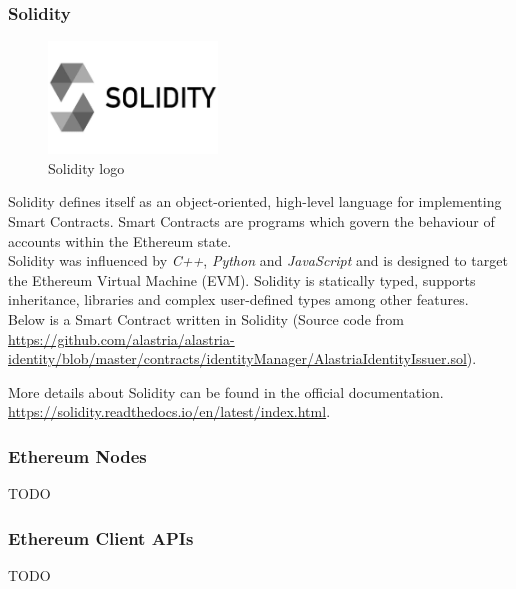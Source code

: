 \documentclass[a4paper, 12pt]{article} %
\begin{document}
        \subsubsection{Solidity}
            \begin{figure}[h]
                \centering
                \includegraphics[width=0.4\textwidth]{solidity-logo.jpg}
                \caption{Solidity logo}
                \label{fig:solidity_logo}
            \end{figure}
            
            Solidity defines itself as an object-oriented, high-level language for implementing Smart Contracts. Smart Contracts are programs which govern the behaviour of accounts within the Ethereum state.\\
            
            Solidity was influenced by \textit{C++}, \textit{Python} and \textit{JavaScript} and is designed to target the Ethereum Virtual Machine (EVM). Solidity is statically typed, supports inheritance, libraries and complex user-defined types among other features.\\

            
            Below is a Smart Contract written in Solidity (Source code from \url{https://github.com/alastria/alastria-identity/blob/master/contracts/identityManager/AlastriaIdentityIssuer.sol}).
            
    
            More details about Solidity can be found in the official documentation. \url{https://solidity.readthedocs.io/en/latest/index.html}.
            
        \subsubsection{Ethereum Nodes}
            TODO
            
        \subsubsection{Ethereum Client APIs}
            TODO
            
\end{document}
